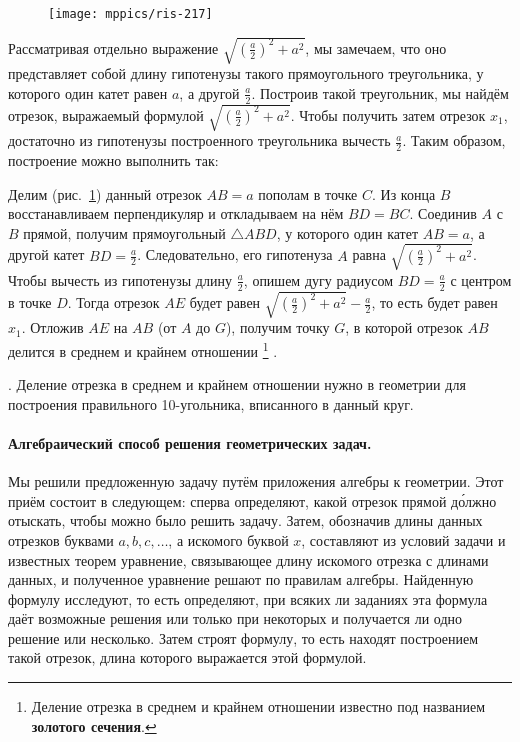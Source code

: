 \documentclass[twoside]{book}
\makeatletter
\newcommand{\rindex}[2][\imki@jobname]{%
  \index[#1]{\detokenize{#2}}%
}
\makeatother
\begin{document}
\begin{figure}
\centering
\texttt{[image: mppics/ris-217]}
\caption{}\label{1938/ris-217}
\end{figure}

\noindent
Рассматривая отдельно выражение $\sqrt{(\frac a2)^2+a^2}$, мы замечаем, что оно представляет собой длину гипотенузы такого прямоугольного треугольника, у которого один катет равен $a$, а другой $\frac a2$.
Построив такой треугольник, мы найдём отрезок, выражаемый формулой $\sqrt{(\frac a2)^2+a^2}$.
Чтобы получить затем отрезок $x_1$, достаточно из гипотенузы построенного треугольника вычесть $\frac a2$.
Таким образом, построение можно выполнить так:

Делим (рис.~\ref{1938/ris-217}) данный отрезок $AB=a$ пополам в точке $C$.
Из конца $B$ восстанавливаем перпендикуляр и откладываем на нём $BD = BC$.
Соединив $A$ с $B$ прямой, получим прямоугольный $\triangle ABD$, у которого один катет $AB=a$, а другой катет $BD=\frac a2$.
Следовательно, его гипотенуза $A$ равна $\sqrt{(\frac a2)^2+a^2}$.
Чтобы вычесть из гипотенузы длину $\frac a2$, опишем дугу радиусом $BD=\frac a2$ с центром в точке $D$.
Тогда отрезок $AE$ будет равен $\sqrt{(\frac a2)^2+a^2}-\frac a2$, 
то есть будет равен $x_1$.
Отложив $AE$ на $AB$ (от $A$ до $G$), получим точку $G$, в которой отрезок $AB$ делится в среднем и крайнем отношении%
\footnote{Деление отрезка в среднем и крайнем отношении известно под названием \rindex{золотое сечение}\textbf{золотого сечения}.}%
.

\smallskip
{}.
Деление отрезка в среднем и крайнем отношении нужно в геометрии для построения правильного 10-угольника, вписанного в данный круг.

\paragraph{Алгебраический способ решения геометрических задач.}\label{1938/210}
Мы решили предложенную задачу путём приложения алгебры к геометрии.
Этот приём состоит в следующем:
сперва определяют, какой отрезок прямой д\'{о}лжно отыскать, чтобы можно было решить задачу.
Затем, обозначив длины данных отрезков буквами $a, b, c,\dots$, а искомого буквой $x$, составляют из условий задачи и известных теорем уравнение, связывающее длину искомого отрезка с длинами данных, и полученное уравнение решают по правилам алгебры.
Найденную формулу исследуют, то есть определяют, при всяких ли заданиях эта формула даёт возможные решения или только при некоторых и получается ли одно решение или несколько.
Затем строят формулу, то есть находят построением такой отрезок, длина которого выражается этой формулой.
\end{document}
